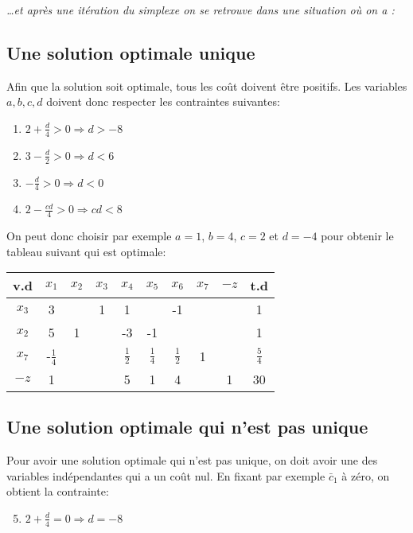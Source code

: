 \emph{\dots et après une itération du simplexe on se retrouve dans une situation où on a :}

\subsection{Une solution optimale unique}

Afin que la solution soit optimale, tous les coût doivent être positifs. Les variables $a,b,c,d$ doivent donc respecter les contraintes suivantes:
\begin{enumerate}[label=(\arabic*),itemsep=1pt]
	\item $2 + \frac{d}{4} > 0 \Rightarrow d > -8$
	\item $3 - \frac{d}{2} > 0 \Rightarrow d < 6$
	\item $ - \frac{d}{4} > 0 \Rightarrow d < 0$
	\item $2 - \frac{cd}{4} > 0 \Rightarrow cd < 8$
\end{enumerate}

On peut donc choisir par exemple $a = 1$, $b=4$, $c=2$ et $d=-4$ pour obtenir le tableau suivant qui est optimale:
	
\begin{center}
	\renewcommand{\arraystretch}{1.5}
	\begin{tabular}{|c|cccccccc|c|}
		\hline
		 v.d  &     $x_1$      & $x_2$ & $x_3$ &     $x_4$     &     $x_5$     &     $x_6$     & $x_7$ & $-z$ &      t.d      \\ \hline
		$x_3$ &       3        &       &   1   &       1       &               &      -1       &       &      &       1       \\
		$x_2$ &       5        &   1   &       &      -3       &      -1       &               &       &      &       1       \\
		$x_7$ & -$\frac{1}{4}$ &       &       & $\frac{1}{2}$ & $\frac{1}{4}$ & $\frac{1}{2}$ &   1   &      & $\frac{5}{4}$ \\ \hline
		$-z$  &       1        &       &       &       5       &       1       &       4       &       &  1   &      30       \\ \hline
	\end{tabular}
\end{center}

\subsection{Une solution optimale qui n’est pas unique}
Pour avoir une solution optimale qui n’est pas unique, on doit avoir une des variables indépendantes qui a un coût nul. En fixant par exemple $\bar{c}_1$ à zéro, on obtient la contrainte:
\begin{enumerate}[label=(\arabic*),itemsep=1pt]
	\setcounter{enumi}{4}
	\item  $2 + \frac{d}{4} = 0 \Rightarrow d = -8$
\end{enumerate}

